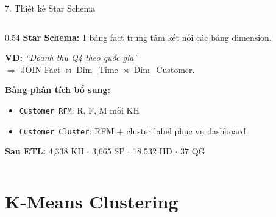 \documentclass[10pt, aspectratio=169]{beamer}
\begin{document}
\begin{frame}{7. Thiết kế Star Schema}
\begin{columns}[T]
        \begin{column}{0.54\textwidth}
            \textbf{Star Schema:} 1 bảng fact trung tâm kết nối các bảng dimension.

            \vspace{0.15cm}
            \textbf{VD:} \textit{``Doanh thu Q4 theo quốc gia''}\\
            $\Rightarrow$ JOIN Fact $\bowtie$ Dim\_Time $\bowtie$ Dim\_Customer.

            \vspace{0.15cm}
            \textbf{Bảng phân tích bổ sung:}
            \begin{itemize}
                \item \texttt{Customer\_RFM}: R, F, M mỗi KH
                \item \texttt{Customer\_Cluster}: RFM + cluster label phục vụ dashboard
            \end{itemize}
            
            \vspace{0.1cm}
            \footnotesize\textbf{Sau ETL:} 4,338 KH $\cdot$ 3,665 SP $\cdot$ 18,532 HĐ $\cdot$ 37 QG
        \end{column}
    \end{columns}
\end{frame}

\section{K-Means Clustering}
\end{document}
